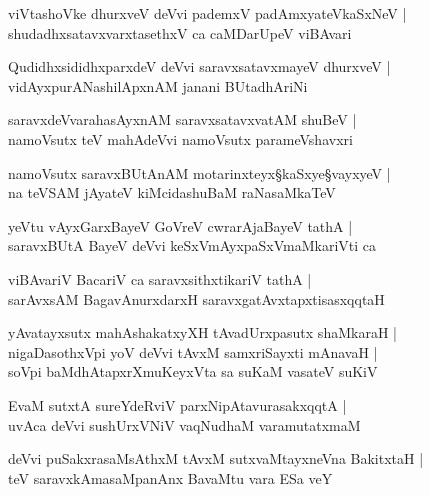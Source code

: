 \begin{shloka}
viVtashoVke dhurxveV deVvi pademxV padAmxyateVkaSxNeV |\\
shudadhxsatavxvarxtasethxV ca caMDarUpeV viBAvari
\end{shloka}

\begin{shloka}
QudidhxsididhxparxdeV deVvi saravxsatavxmayeV dhurxveV |\\
vidAyxpurANashilApxnAM janani BUtadhAriNi
\end{shloka}

\begin{shloka}
saravxdeVvarahasAyxnAM saravxsatavxvatAM shuBeV |\\
namoVsutx teV mahAdeVvi namoVsutx parameVshavxri
\end{shloka}

\begin{shloka}
namoVsutx saravxBUtAnAM motarinxteyx\S kaSxye\S vayxyeV |\\
na teVSAM jAyateV kiMcidashuBaM raNasaMkaTeV 
\end{shloka}

\begin{shloka}
yeVtu vAyxGarxBayeV GoVreV cwrarAjaBayeV tathA |\\
saravxBUtA BayeV deVvi keSxVmAyxpaSxVmaMkariVti ca 
\end{shloka}

\begin{shloka}
viBAvariV  BacariV ca saravxsithxtikariV tathA |\\
sarAvxsAM BagavAnurxdarxH saravxgatAvxtapxtisasxqqtaH
\end{shloka}

\begin{shloka}
yAvatayxsutx mahAshakatxyXH tAvadUrxpasutx shaMkaraH |\\
nigaDasothxVpi yoV deVvi tAvxM samxriSayxti mAnavaH |\\
soVpi baMdhAtapxrXmuKeyxVta sa suKaM vasateV suKiV 
\end{shloka}

\begin{shloka}
EvaM sutxtA sureYdeRviV parxNipAtavurasakxqqtA |\\
uvAca deVvi sushUrxVNiV vaqNudhaM varamutatxmaM
\end{shloka}

\begin{shloka}
deVvi puSakxrasaMsAthxM tAvxM sutxvaMtayxneVna BakitxtaH |\\
teV saravxkAmasaMpanAnx BavaMtu vara ESa veY
\end{shloka}

